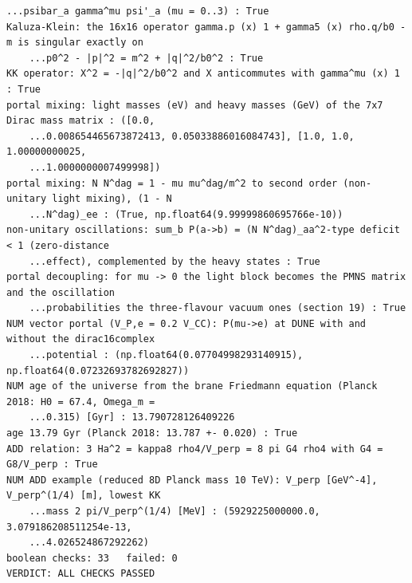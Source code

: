 \documentclass[10pt,a4paper]{article}
\begin{document}
\begin{Verbatim}[fontsize=\small,frame=single,framesep=2mm]
    ...psibar_a gamma^mu psi'_a (mu = 0..3) : True
Kaluza-Klein: the 16x16 operator gamma.p (x) 1 + gamma5 (x) rho.q/b0 - m is singular exactly on
    ...p0^2 - |p|^2 = m^2 + |q|^2/b0^2 : True
KK operator: X^2 = -|q|^2/b0^2 and X anticommutes with gamma^mu (x) 1 : True
portal mixing: light masses (eV) and heavy masses (GeV) of the 7x7 Dirac mass matrix : ([0.0,
    ...0.008654465673872413, 0.05033886016084743], [1.0, 1.0, 1.00000000025,
    ...1.0000000007499998])
portal mixing: N N^dag = 1 - mu mu^dag/m^2 to second order (non-unitary light mixing), (1 - N
    ...N^dag)_ee : (True, np.float64(9.99999860695766e-10))
non-unitary oscillations: sum_b P(a->b) = (N N^dag)_aa^2-type deficit < 1 (zero-distance
    ...effect), complemented by the heavy states : True
portal decoupling: for mu -> 0 the light block becomes the PMNS matrix and the oscillation
    ...probabilities the three-flavour vacuum ones (section 19) : True
NUM vector portal (V_P,e = 0.2 V_CC): P(mu->e) at DUNE with and without the dirac16complex
    ...potential : (np.float64(0.07704998293140915), np.float64(0.07232693782692827))
NUM age of the universe from the brane Friedmann equation (Planck 2018: H0 = 67.4, Omega_m =
    ...0.315) [Gyr] : 13.790728126409226
age 13.79 Gyr (Planck 2018: 13.787 +- 0.020) : True
ADD relation: 3 Ha^2 = kappa8 rho4/V_perp = 8 pi G4 rho4 with G4 = G8/V_perp : True
NUM ADD example (reduced 8D Planck mass 10 TeV): V_perp [GeV^-4], V_perp^(1/4) [m], lowest KK
    ...mass 2 pi/V_perp^(1/4) [MeV] : (5929225000000.0, 3.079186208511254e-13,
    ...4.026524867292262)
boolean checks: 33   failed: 0
VERDICT: ALL CHECKS PASSED
\end{Verbatim}
\end{document}
